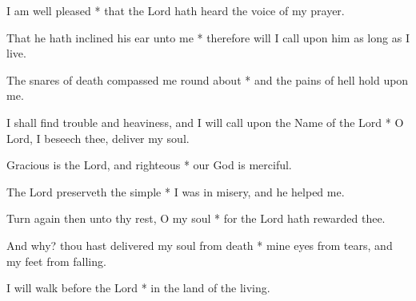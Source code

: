 \begin{multicols}{2}
	
	I am well pleased * that the Lord hath heard the voice of my prayer.
	
	That he hath inclined his ear unto me * therefore will I call upon him as long as I live.
	
	The snares of death compassed me round about * and the pains of hell hold upon me.
	
	I shall find trouble and heaviness, and I will call upon the Name of the Lord * O Lord, I beseech thee, deliver my soul.
	
	Gracious is the Lord, and righteous * our God is merciful.
	
	The Lord preserveth the simple * I was in misery, and he helped me.
	
	Turn again then unto thy rest, O my soul * for the Lord hath rewarded thee.
	
	And why? thou hast delivered my soul from death * mine eyes from tears, and my feet from falling.
	
	I will walk before the Lord * in the land of the living.
	
	\gloria{}
\end{multicols}